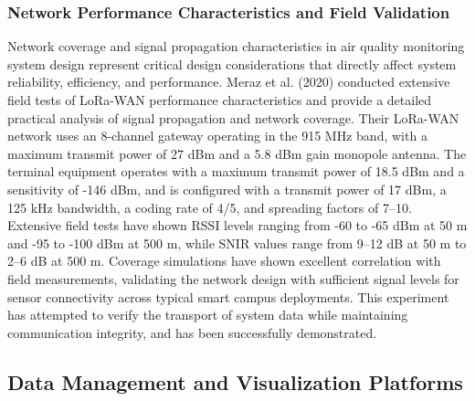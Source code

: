 \documentclass[conference]{IEEEtran}
\begin{document}
\subsubsection{Network Performance Characteristics and Field Validation}
Network coverage and signal propagation characteristics in air quality monitoring system design represent critical design considerations that directly affect system reliability, efficiency, and performance. Meraz et al. (2020) conducted extensive field tests of LoRa-WAN performance characteristics and provide a detailed practical analysis of signal propagation and network coverage. Their LoRa-WAN network uses an 8-channel gateway operating in the 915 MHz band, with a maximum transmit power of 27 dBm and a 5.8 dBm gain monopole antenna. The terminal equipment operates with a maximum transmit power of 18.5 dBm and a sensitivity of -146 dBm, and is configured with a transmit power of 17 dBm, a 125 kHz bandwidth, a coding rate of 4/5, and spreading factors of 7--10. Extensive field tests have shown RSSI levels ranging from -60 to -65 dBm at 50 m and -95 to -100 dBm at 500 m, while SNIR values range from 9--12 dB at 50 m to 2--6 dB at 500 m. Coverage simulations have shown excellent correlation with field measurements, validating the network design with sufficient signal levels for sensor connectivity across typical smart campus deployments. This experiment has attempted to verify the transport of system data while maintaining communication integrity, and has been successfully demonstrated.~\cite{meraz2020}

\subsection{Data Management and Visualization Platforms}
\end{document}
